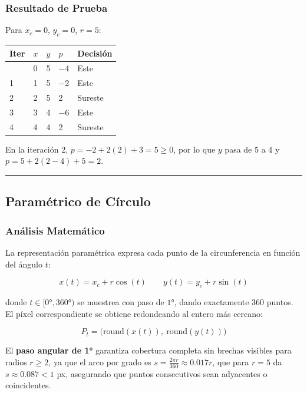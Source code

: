 \documentclass[
  spanish,
  a4paper,
  12pt,
]{article}
\newcounter{none} %
\begin{document}
\subsubsection{Resultado de Prueba}\label{resultado-de-prueba-3}

Para \(x_c=0\), \(y_c=0\), \(r=5\):

{\def\LTcaptype{none} %
\begin{longtable}[]{@{}lllll@{}}
\toprule\noalign{}
Iter & \(x\) & \(y\) & \(p\) & Decisión \\
\midrule\noalign{}
\endhead
\bottomrule\noalign{}
\endlastfoot
0 & 0 & 5 & −4 & Este \\
1 & 1 & 5 & −2 & Este \\
2 & 2 & 5 & 2 & Sureste \\
3 & 3 & 4 & −6 & Este \\
4 & 4 & 4 & 2 & Sureste \\
\end{longtable}
}

En la iteración 2, \(p = -2 + 2(2)+3 = 5 \geq 0\), por lo que \(y\) pasa
de 5 a 4 y \(p = 5 + 2(2-4)+5 = 2\).

\begin{center}\rule{0.5\linewidth}{0.5pt}\end{center}

\subsection{Paramétrico de
Círculo}\label{paramuxe9trico-de-cuxedrculo}

\subsubsection{Análisis
Matemático}\label{anuxe1lisis-matemuxe1tico-4}

La representación paramétrica expresa cada punto de la circunferencia en
función del ángulo \(t\):

\[x(t) = x_c + r\cos(t) \qquad y(t) = y_c + r\sin(t)\]

donde \(t \in [0°, 360°)\) se muestrea con paso de \(1°\), dando
exactamente 360 puntos. El píxel correspondiente se obtiene redondeando
al entero más cercano:

\[P_t = \bigl(\text{round}(x(t)),\ \text{round}(y(t))\bigr)\]

El \textbf{paso angular de 1°} garantiza cobertura completa sin brechas
visibles para radios \(r \geq 2\), ya que el arco por grado es
\(s = \frac{2\pi r}{360} \approx 0.017r\), que para \(r=5\) da
\(s \approx 0.087 < 1\) px, asegurando que puntos consecutivos sean
adyacentes o coincidentes.
\end{document}
